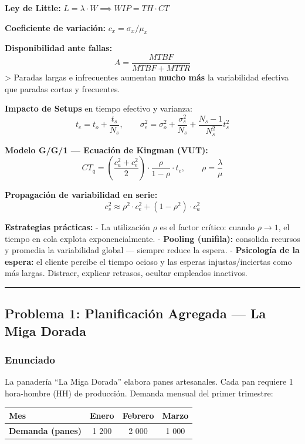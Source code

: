 \documentclass[
]{article}
\begin{document}
\textbf{Ley de Little:}
\(L = \lambda \cdot W \implies WIP = TH \cdot CT\)

\textbf{Coeficiente de variación:} \(c_x = \sigma_x / \mu_x\)

\textbf{Disponibilidad ante fallas:} \[A = \frac{MTBF}{MTBF + MTTR}\]
\textgreater{} Paradas largas e infrecuentes aumentan \textbf{mucho más}
la variabilidad efectiva que paradas cortas y frecuentes.

\textbf{Impacto de Setups} en tiempo efectivo y varianza:
\[t_e = t_o + \frac{t_s}{N_s}, \qquad \sigma_e^2 = \sigma_o^2 + \frac{\sigma_s^2}{N_s} + \frac{N_s - 1}{N_s^2} t_s^2\]

\textbf{Modelo G/G/1 --- Ecuación de Kingman (VUT):}
\[CT_q = \left(\frac{c_a^2 + c_e^2}{2}\right) \cdot \frac{\rho}{1-\rho} \cdot t_e, \qquad \rho = \frac{\lambda}{\mu}\]

\textbf{Propagación de variabilidad en serie:}
\[c_s^2 \approx \rho^2 \cdot c_e^2 + (1 - \rho^2) \cdot c_a^2\]

\textbf{Estrategias prácticas:} - La utilización \(\rho\) es el factor
crítico: cuando \(\rho \to 1\), el tiempo en cola explota
exponencialmente. - \textbf{Pooling (unifila):} consolida recursos y
promedia la variabilidad global --- siempre reduce la espera. -
\textbf{Psicología de la espera:} el cliente percibe el tiempo ocioso y
las esperas injustas/inciertas como más largas. Distraer, explicar
retrasos, ocultar empleados inactivos.

\begin{center}\rule{0.5\linewidth}{0.5pt}\end{center}

\hypertarget{problema-1-planificaciuxf3n-agregada-la-miga-dorada}{%
\subsection{Problema 1: Planificación Agregada --- La Miga
Dorada}\label{problema-1-planificaciuxf3n-agregada-la-miga-dorada}}

\hypertarget{enunciado}{%
\subsubsection{Enunciado}\label{enunciado}}

La panadería ``La Miga Dorada'' elabora panes artesanales. Cada pan
requiere 1 hora-hombre (HH) de producción. Demanda mensual del primer
trimestre:

\begin{longtable}[]{@{}lccc@{}}
\toprule\noalign{}
Mes & Enero & Febrero & Marzo \\
\midrule\noalign{}
\endhead
\bottomrule\noalign{}
\endlastfoot
\textbf{Demanda (panes)} & 1 200 & 2 000 & 1 000 \\
\end{longtable}
\end{document}
